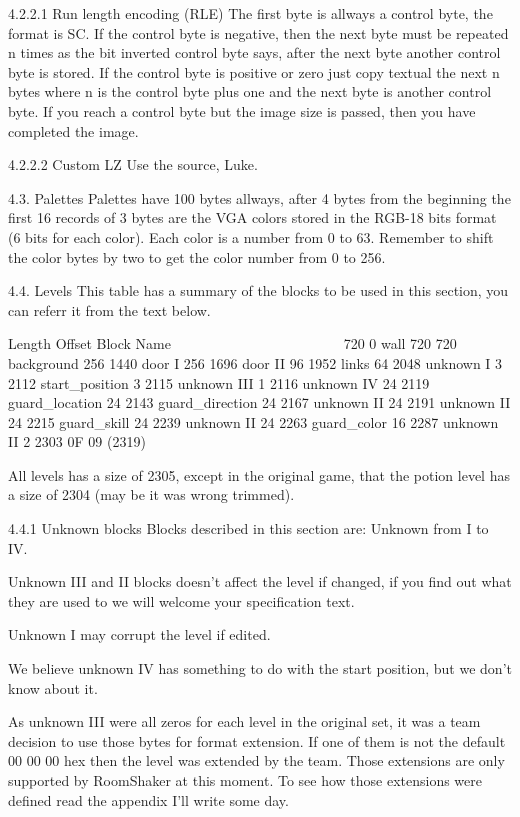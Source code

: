 4.2.2.1 Run length encoding (RLE)
 The first byte is allways a control byte, the format is SC. If the control
 byte is negative, then the next byte must be repeated n times as the bit
 inverted control byte says, after the next byte another control byte is
 stored.
 If the control byte is positive or zero just copy textual the next n bytes
 where n is the control byte plus one and the next byte is another control
 byte.
 If you reach a control byte but the image size is passed, then you have
 completed the image.

4.2.2.2 Custom LZ
 Use the source, Luke.
 
4.3. Palettes
 Palettes have 100 bytes allways, after 4 bytes from the beginning the
 first 16 records of 3 bytes are the VGA colors stored in the RGB-18 bits
 format (6 bits for each color). Each color is a number from 0 to 63.
 Remember to shift the color bytes by two to get the color number from 0
 to 256.
 
4.4. Levels
 This table has a summary of the blocks to be used in this section,
 you can referr it from the text below.

 Length Offset  Block Name
 ~~~~~~ ~~~~~~  ~~~~~~~~~~
 720    0       wall
 720    720     background
 256    1440    door I
 256    1696    door II
 96     1952    links
 64     2048    unknown I
 3      2112    start_position
 3      2115    unknown III
 1      2116    unknown IV
 24     2119    guard_location
 24     2143    guard_direction
 24     2167    unknown II
 24     2191    unknown II
 24     2215    guard_skill
 24     2239    unknown II
 24     2263    guard_color
 16     2287    unknown II
 2      2303    0F 09 (2319)

 All levels has a size of 2305, except in the original game, that the potion
 level has a size of 2304 (may be it was wrong trimmed).

4.4.1 Unknown blocks
 Blocks described in this section are: Unknown from I to IV.

 Unknown III and II blocks doesn't affect the level if changed, if you find
 out what they are used to we will welcome your specification text.

 Unknown I may corrupt the level if edited.

 We believe unknown IV has something to do with the start position, but we
 don't know about it.

 As unknown III were all zeros for each level in the original set, it was a
 team decision to use those bytes for format extension. If one of them is
 not the default 00 00 00 hex then the level was extended by the team. Those
 extensions are only supported by RoomShaker at this  moment. To see how
 those extensions were defined read the appendix I'll write some day.
 
